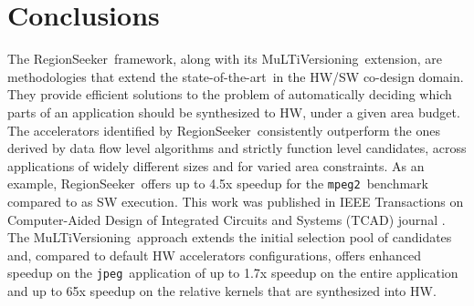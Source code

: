 \documentclass[]{usiinfthesis}
\newcommand{\rseeker}{{RegionSeeker}}
\newcommand{\multi}{MuLTiVersioning}
\newcommand{\SoTA}{{state-of-the-art}}
\newcommand{\jpeg}{\texttt{jpeg}}
\newcommand{\mpeg}{\texttt{mpeg2}}
\begin{document}





\section{Conclusions}
\label{sec:rs_conclusions}

The \rseeker\ framework, along with its %
\multi\ extension, are methodologies that extend the \SoTA\ in the HW/SW co-design domain. They provide
efficient solutions to the problem of automatically deciding which parts of an application should
be synthesized to HW, under a given area budget. The accelerators identified by \rseeker\ 
consistently outperform the ones derived by data flow level algorithms and strictly function 
level candidates, across applications of widely different sizes and for varied area constraints.
As an example, \rseeker\ offers up to 4.5x speedup for the \mpeg\ benchmark compared to as SW
execution. This work was published in IEEE Transactions on Computer-Aided Design of Integrated 
Circuits and Systems (TCAD) journal \cite{ZacharopoulosApr19}.
The \multi\ approach extends the initial selection pool of candidates and, compared
to default HW accelerators configurations, offers enhanced speedup on the \jpeg\ application of up
to 1.7x speedup on the entire application and up to 65x speedup on the relative kernels that 
are synthesized into HW.

\end{document}
